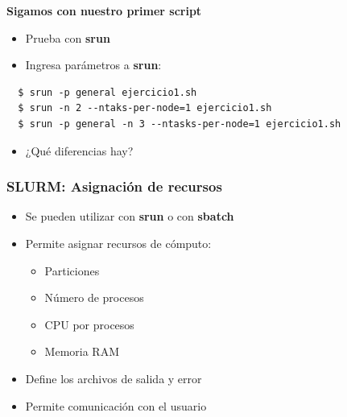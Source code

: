 \documentclass[aspectratio=169,professionalfonts]{beamer}
\begin{document}
\begin{frame}[fragile]
{\textbf{Sigamos con nuestro primer script}}
\begin{itemize}
    \item Prueba con \textbf{srun}\vspace{0.5em}
    \vspace{0.5em}
    \item Ingresa parámetros a \textbf{srun}:
    \vspace{0.5em}
   \end{itemize} 



  \begin{verbatim}
  $ srun -p general ejercicio1.sh
  $ srun -n 2 --ntaks-per-node=1 ejercicio1.sh
  $ srun -p general -n 3 --ntasks-per-node=1 ejercicio1.sh
  \end{verbatim} 
  \vspace{0.5em}
    \begin{itemize}
        \item ¿Qué diferencias hay?
    \end{itemize}
    \end{frame}

\begin{frame}[fragile]
\frametitle{\textbf{SLURM: Asignación de recursos}}
\begin{itemize}
    \item Se pueden utilizar con \textbf{srun} o con \textbf{sbatch}
    \vspace{0.5em}
    \item Permite asignar recursos de cómputo:
    \vspace{0.5em}
    \begin{itemize}
        \item Particiones
        \item Número de procesos
        \item CPU por procesos
        \item Memoria RAM
    \end{itemize}
    \item Define los archivos de salida y error
    \vspace{0.5em}
    \item Permite comunicación con el usuario
\end{itemize}
    
\end{frame}
\end{document}
